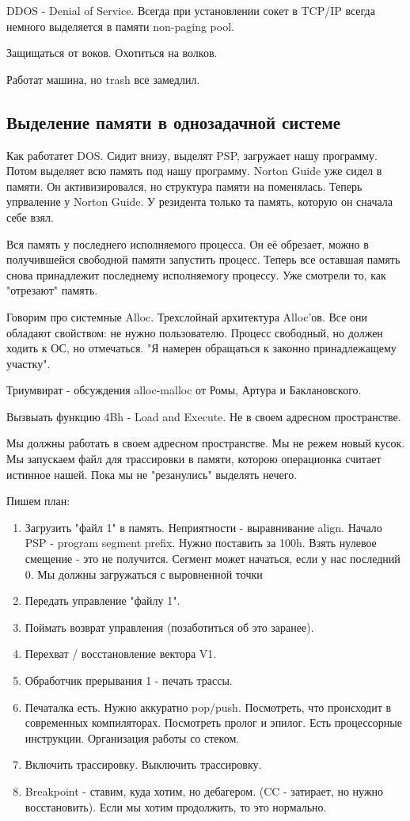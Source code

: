 DDOS - Denial of Service. Всегда при установлении сокет в TCP/IP всегда немного выделяется в памяти non-paging pool.

Защищаться от воков. Охотиться на волков. 

Работат машина, но trash все замедлил. 

\subsection{Выделение памяти в однозадачной системе}
Как работатет DOS. Сидит внизу, выделят PSP, загружает нашу программу. Потом выделяет всю память под нашу программу. Norton Guide уже сидел в памяти. Он активизировался, но структура памяти на поменялась. Теперь упрваление у Norton Guide. У резидента только та память, которую он сначала себе взял.

Вся память у последнего исполняемого процесса. Он её обрезает, можно в получившейся свободной памяти запустить процесс. Теперь все оставшая память снова принадлежит последнему исполняемогу процессу. Уже смотрели то, как "отрезают" память.

Говорим про системные Alloc. Трехслойнай архитектура Alloc'ов. Все они обладают свойством: не нужно пользователю. Процесс свободный, но должен ходить к ОС, но отмечаться. "Я намерен обращаться к законно принадлежащему участку".

Триумвират - обсуждения alloc-malloc от Ромы, Артура и Баклановского.
 
Вызвыать функцию 4Bh - Load and Execute. Не в своем адресном пространстве.

Мы должны работать в своем адресном пространстве. Мы не режем новый кусок. Мы запускаем файл для трассировки в памяти, которою операционка считает истинное нашей. Пока мы не "резанулись" выделять нечего. 

Пишем план:
\begin{enumerate}
\item Загрузить "файл 1" в память. Неприятности - выравнивание align. Начало PSP - program segment prefix. Нужно поставить за 100h. Взять нулевое смещение - это не получится. Сегмент может начаться, если у нас последний 0.
Мы должны загружаться с выровненной точки
\item Передать управление "файлу 1".
\item Поймать возврат управления (позаботиться об это заранее).
\item Перехват / восстановление вектора V1.
\item Обработчик прерывания 1 - печать трассы.
\item Печаталка есть. Нужно аккуратно pop/push. Посмотреть, что происходит в современных компиляторах. Посмотреть пролог и эпилог. Есть процессорные инструкции. Организация работы со стеком.
\item Включить трассировку. Выключить трассировку.
\item Breakpoint - ставим, куда хотим, но дебагером. (CC - затирает, но нужно восстановить). Если мы хотим продолжить, то это нормально.
\end{enumerate}


